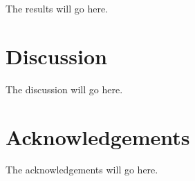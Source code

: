 \documentclass[12pt]{article}
\begin{document}
The results will go here.


\section*{Discussion}

The discussion will go here.


\section*{Acknowledgements}

The acknowledgements will go here.
\end{document}
